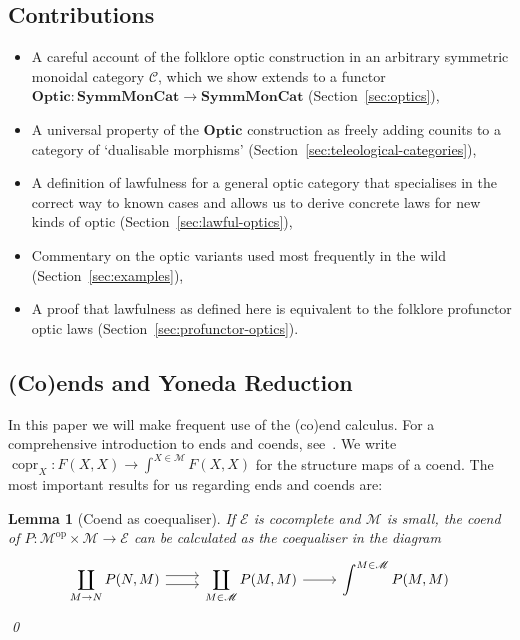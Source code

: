 \documentclass[11pt,letterpaper]{article}
\theoremstyle{plain}
\newtheorem{lemma}[theorem]{Lemma}
\theoremstyle{definition}
\newcommand{\C}{\mathscr{C}}
\newcommand{\E}{\mathscr{E}}
\newcommand{\M}{\mathscr{M}}
\newcommand{\SymmMonCat}{\mathbf{SymmMonCat}}
\newcommand{\Optic}{\mathbf{Optic}}
\newcommand{\op}{\mathrm{op}}
\DeclareMathOperator{\copr}{copr}
\begin{document}
\subsection{Contributions}
  \begin{itemize}
  \item A careful account of the folklore optic construction in an arbitrary symmetric monoidal category $\C$, which we show extends to a functor $\Optic : \SymmMonCat \to \SymmMonCat$ (Section~\ref{sec:optics}),
  \item A universal property of the $\Optic$ construction as freely adding counits to a category of `dualisable morphisms' (Section~\ref{sec:teleological-categories}),
  \item A definition of lawfulness for a general optic category that specialises in the correct way to known cases and allows us to derive concrete laws for new kinds of optic (Section~\ref{sec:lawful-optics}),
  \item Commentary on the optic variants used most frequently in the wild (Section~\ref{sec:examples}),
  \item A proof that lawfulness as defined here is equivalent to the folklore profunctor optic laws (Section~\ref{sec:profunctor-optics}).
  \end{itemize}

\subsection{(Co)ends and Yoneda Reduction}

In this paper we will make frequent use of the (co)end calculus. For a comprehensive introduction to ends and coends, see~\cite{CoendCofriend}. We write $\copr_X : F(X, X) \to \int^{X \in \M} F(X, X)$ for the structure maps of a coend. The most important results for us regarding ends and coends are:

\begin{lemma}[Coend as coequaliser]\label{lemma:calculate-coend}
If $\E$ is cocomplete and $\M$ is small, the coend of $P : \M^\op \times \M \to \E$ can be calculated as the coequaliser in the diagram
\[
  \begin{tikzcd}
    \displaystyle \coprod_{M \to N} P(N, M) \ar[r,shift left=.75ex]  \ar[r,shift right=.75ex] & \displaystyle\coprod_{M \in \M} P(M, M) \ar[r] & \displaystyle\int^{M \in \M} P(M, M)
  \end{tikzcd}
\]
\qed
\end{lemma}
\end{document}
